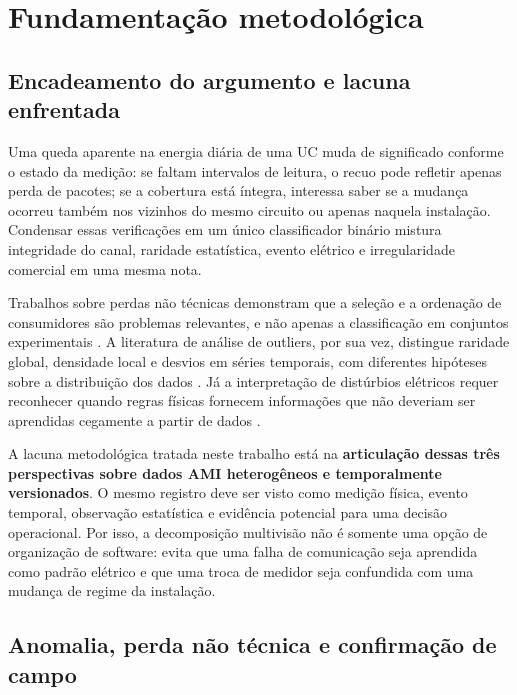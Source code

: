 \chapter{Fundamentação metodológica}\label{fundamentauxe7uxe3o-metodoluxf3gica}

\section{Encadeamento do argumento e lacuna enfrentada}\label{encadeamento-do-argumento-e-lacuna-enfrentada}

Uma queda aparente na energia diária de uma UC muda de significado conforme o estado da medição: se faltam intervalos de leitura, o recuo pode refletir apenas perda de pacotes; se a cobertura está íntegra, interessa saber se a mudança ocorreu também nos vizinhos do mesmo circuito ou apenas naquela instalação. Condensar essas verificações em um único classificador binário mistura integridade do canal, raridade estatística, evento elétrico e irregularidade comercial em uma mesma nota.

Trabalhos sobre perdas não técnicas demonstram que a seleção e a ordenação de consumidores são problemas relevantes, e não apenas a classificação em conjuntos experimentais \autocite{sau2023,han2026}. A literatura de análise de outliers, por sua vez, distingue raridade global, densidade local e desvios em séries temporais, com diferentes hipóteses sobre a distribuição dos dados \autocite{aggarwal2017}. Já a interpretação de distúrbios elétricos requer reconhecer quando regras físicas fornecem informações que não deveriam ser aprendidas cegamente a partir de dados \autocite{bollen2007,bollen2006}.

A lacuna metodológica tratada neste trabalho está na \textbf{articulação dessas três perspectivas sobre dados AMI heterogêneos e temporalmente versionados}. O mesmo registro deve ser visto como medição física, evento temporal, observação estatística e evidência potencial para uma decisão operacional. Por isso, a decomposição multivisão não é somente uma opção de organização de software: evita que uma falha de comunicação seja aprendida como padrão elétrico e que uma troca de medidor seja confundida com uma mudança de regime da instalação.

\section{Anomalia, perda não técnica e confirmação de campo}\label{anomalia-perda-nuxe3o-tuxe9cnica-e-confirmauxe7uxe3o-de-campo}

